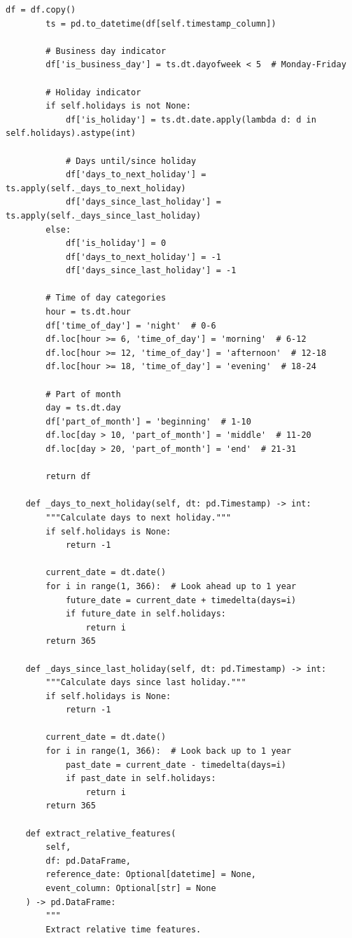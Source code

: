 \begin{lstlisting}[style=python, caption={Comprehensive Temporal Feature Engineering}]
        df = df.copy()
        ts = pd.to_datetime(df[self.timestamp_column])

        # Business day indicator
        df['is_business_day'] = ts.dt.dayofweek < 5  # Monday-Friday

        # Holiday indicator
        if self.holidays is not None:
            df['is_holiday'] = ts.dt.date.apply(lambda d: d in self.holidays).astype(int)

            # Days until/since holiday
            df['days_to_next_holiday'] = ts.apply(self._days_to_next_holiday)
            df['days_since_last_holiday'] = ts.apply(self._days_since_last_holiday)
        else:
            df['is_holiday'] = 0
            df['days_to_next_holiday'] = -1
            df['days_since_last_holiday'] = -1

        # Time of day categories
        hour = ts.dt.hour
        df['time_of_day'] = 'night'  # 0-6
        df.loc[hour >= 6, 'time_of_day'] = 'morning'  # 6-12
        df.loc[hour >= 12, 'time_of_day'] = 'afternoon'  # 12-18
        df.loc[hour >= 18, 'time_of_day'] = 'evening'  # 18-24

        # Part of month
        day = ts.dt.day
        df['part_of_month'] = 'beginning'  # 1-10
        df.loc[day > 10, 'part_of_month'] = 'middle'  # 11-20
        df.loc[day > 20, 'part_of_month'] = 'end'  # 21-31

        return df

    def _days_to_next_holiday(self, dt: pd.Timestamp) -> int:
        """Calculate days to next holiday."""
        if self.holidays is None:
            return -1

        current_date = dt.date()
        for i in range(1, 366):  # Look ahead up to 1 year
            future_date = current_date + timedelta(days=i)
            if future_date in self.holidays:
                return i
        return 365

    def _days_since_last_holiday(self, dt: pd.Timestamp) -> int:
        """Calculate days since last holiday."""
        if self.holidays is None:
            return -1

        current_date = dt.date()
        for i in range(1, 366):  # Look back up to 1 year
            past_date = current_date - timedelta(days=i)
            if past_date in self.holidays:
                return i
        return 365

    def extract_relative_features(
        self,
        df: pd.DataFrame,
        reference_date: Optional[datetime] = None,
        event_column: Optional[str] = None
    ) -> pd.DataFrame:
        """
        Extract relative time features.


\end{lstlisting}
